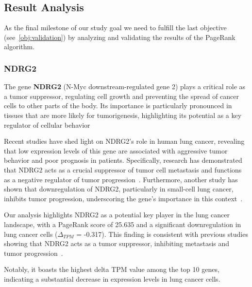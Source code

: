 \subsection{Result Analysis} \label{subsec:result_analysis}
As the final milestone of our study goal we need to fulfill the last objective (see~\ref{obj:validation}) by analyzing and
validating the results of the PageRank algorithm.\\

\subsubsection*{NDRG2} \label{subsubsec:ndrg2}
The gene \textbf{NDRG2} (N-Myc downstream-regulated gene 2) plays a critical role as a tumor suppressor,
regulating cell growth and preventing the spread of cancer cells to other parts of the body.
Its importance is particularly pronounced in tissues that are more likely for tumorigenesis,
highlighting its potential as a key regulator of cellular behavior~\cite{Lee2022NDRG2}

Recent studies have shed light on NDRG2's role in human lung cancer,
revealing that low expression levels of this gene are associated with aggressive tumor behavior and poor prognosis in patients.
Specifically, research has demonstrated that NDRG2 acts as a crucial suppressor of tumor cell metastasis and
functions as a negative regulator of tumor progression~\cite{Li2013NDRG2}.
Furthermore, another study has shown that downregulation of NDRG2, particularly in small-cell lung cancer,
inhibits tumor progression, underscoring the gene's importance in this context~\cite{Ma2024NDRG2}.

Our analysis highlights NDRG2 as a potential key player in the lung cancer landscape,
with a PageRank score of 25.635 and a significant downregulation in lung cancer cells ($\Delta_{TPM}$ = -0.317).
This finding is consistent with previous studies showing that NDRG2 acts as a tumor suppressor,
inhibiting metastasis and tumor progression~\cite{Li2013NDRG2,Ma2024NDRG2}.

Notably, it boasts the highest delta TPM value among the top 10 genes,
indicating a substantial decrease in expression levels in lung cancer cells.
\newline

